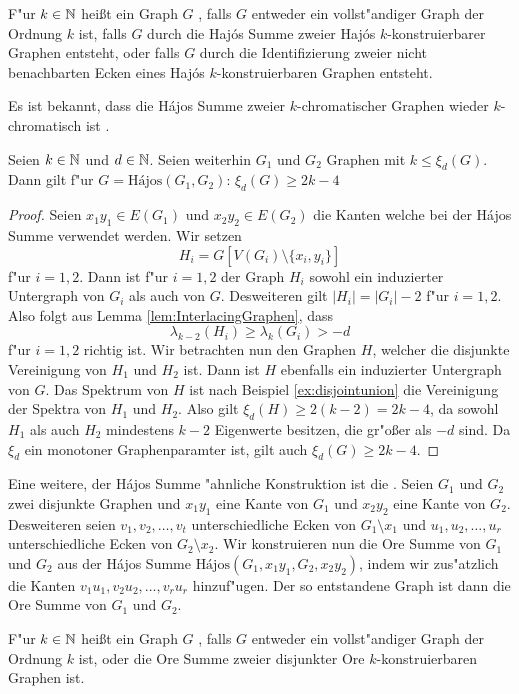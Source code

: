 F"ur $k\in {\mathbb{N}}$ hei{\ss}t ein Graph $G$ , falls $G$ entweder ein vollst"andiger Graph der Ordnung $k$ ist, falls $G$ durch die Haj\'os Summe zweier Haj\'os $k$-konstruierbarer Graphen entsteht, oder falls $G$ durch die Identifizierung zweier nicht benachbarten Ecken eines Haj\'os $k$-konstruierbaren Graphen entsteht. 

Es ist bekannt, dass die H\'ajos Summe zweier $k$-chromatischer Graphen wieder $k$-chromatisch ist . 

\begin{theorem}
  Seien $k\in{\mathbb{N}}$ und $d\in{\mathbb{N}}$. Seien weiterhin $G_1$ und $G_2$ Graphen mit $k\leq \xi_{d}(G)$. Dann gilt f"ur $G= \text{H\'ajos}(G_1,G_2)$:
  $\xi_{d}(G) \geq 2k-4$
  \label{thm:hajoseigenwerte}
\end{theorem}

\begin{proof}
  Seien $x_1y_1\in E(G_1)$ und $x_2y_2\in E(G_2)$ die Kanten welche bei der H\'ajos Summe verwendet werden. Wir setzen $$H_i = G[V(G_i)\setminus\{x_i,y_i\}] $$ f"ur $i=1,2$. Dann ist f"ur $i=1,2$ der Graph $H_i$ sowohl ein induzierter Untergraph von $G_i$ als auch von $G$. 
  Desweiteren gilt $|H_i| = |G_i|-2$ f"ur $i=1,2$. Also folgt aus Lemma \ref{lem:InterlacingGraphen}, dass $$\lambda_{k-2}(H_i) \geq \lambda_{k}(G_i) > -d$$ f"ur $i=1,2$ richtig ist. Wir betrachten nun den Graphen $H$, welcher die disjunkte Vereinigung von $H_1$ und $H_2$ ist. Dann ist $H$ ebenfalls ein induzierter Untergraph von $G$. 
  Das Spektrum von $H$ ist nach Beispiel \ref{ex:disjointunion} die Vereinigung der Spektra von $H_1$ und $H_2$. Also gilt $\xi_{d}(H) \geq 2(k-2) = 2k-4$, da sowohl $H_1$ als auch $H_2$ mindestens $k-2$ Eigenwerte besitzen, die gr"o{\ss}er als $-d$ sind. 
  Da $\xi_d$ ein monotoner Graphenparamter ist, gilt auch $\xi_{d}(G) \geq 2k-4$.
\end{proof}

Eine weitere, der H\'ajos Summe "ahnliche Konstruktion ist die  \cite{Ore67}. Seien $G_1$ und $G_2$ zwei disjunkte Graphen und $x_1y_1$ eine Kante von $G_1$ und $x_2y_2$ eine Kante von $G_2$. Desweiteren seien $v_1,v_2,\dots,v_t$ unterschiedliche Ecken von $G_1\setminus x_1$ und $u_1,u_2,\dots,u_r$ unterschiedliche Ecken von $G_2\setminus x_2$. Wir konstruieren nun die Ore Summe von $G_1$ und $G_2$ aus der H\'ajos Summe
$\text{H\'ajos}(G_1,x_1y_1, G_2, x_2y_2)$, indem wir zus"atzlich die Kanten $v_1u_1,v_2u_2,\dots,v_ru_r$ hinzuf"ugen. Der so entstandene Graph ist dann die Ore Summe von $G_1$ und $G_2$. 

F"ur $k\in{\mathbb{N}}$ hei{\ss}t ein Graph $G$ , falls $G$ entweder ein vollst"andiger Graph der Ordnung $k$ ist, oder die Ore Summe zweier disjunkter Ore $k$-konstruierbaren Graphen ist. 
